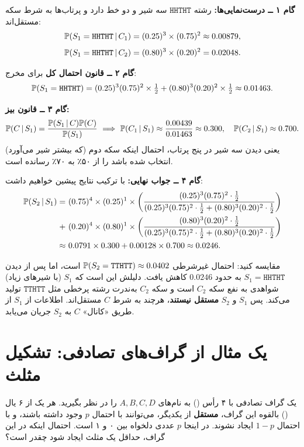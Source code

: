 \textbf{گام ۱ ــ درست‌نمایی‌ها:} رشته $\mathtt{HHTHT}$ سه شیر و دو خط دارد و پرتاب‌ها به شرط سکه مستقل‌اند:
\[
\mathbb{P}(S_1=\mathtt{HHTHT}\,|\, C_1)=(0.25)^3\times(0.75)^2\approx0.00879,
\]
\[
\mathbb{P}(S_1=\mathtt{HHTHT}\,|\, C_2)=(0.80)^3\times(0.20)^2=0.02048 .
\]

\textbf{گام ۲ ــ قانون احتمال کل} برای مخرج:
\[
\mathbb{P}(S_1=\mathtt{HHTHT})=(0.25)^3(0.75)^2\times\tfrac12+(0.80)^3(0.20)^2\times\tfrac12\approx0.01463 .
\]

\textbf{گام ۳ ــ قانون بیز:}
\[
\mathbb{P}(C\,|\, S_1)=\frac{\mathbb{P}(S_1\,|\, C)\mathbb{P}(C)}{\mathbb{P}(S_1)}\ \Longrightarrow\
\mathbb{P}(C_1\,|\, S_1)\approx\frac{0.00439}{0.01463}\approx0.300,\quad
\mathbb{P}(C_2\,|\, S_1)\approx0.700 .
\]
یعنی دیدن سه شیر در پنج پرتاب، احتمال اینکه سکه دوم (که بیشتر شیر می‌آورد) انتخاب شده باشد را از ۵۰٪ به ۷۰٪ رسانده است.

\textbf{گام ۴ ــ جواب نهایی:} با ترکیب نتایج پیشین خواهیم داشت:
\[
\begin{aligned}
\Prob(S_2\given S_1)=\ &(0.75)^4\times(0.25)^1\times\left(\frac{(0.25)^3(0.75)^2\cdot\frac12}{(0.25)^3(0.75)^2\cdot\frac12+(0.80)^3(0.20)^2\cdot\frac12}\right)\\
+\ &(0.20)^4\times(0.80)^1\times\left(\frac{(0.80)^3(0.20)^2\cdot\frac12}{(0.25)^3(0.75)^2\cdot\frac12+(0.80)^3(0.20)^2\cdot\frac12}\right)\\
\approx\ &0.0791\times0.300+0.00128\times0.700\approx0.0246 .
\end{aligned}
\]

\begin{note}
\notetitle مقایسه کنید: احتمال غیرشرطی $\mathbb{P}(S_2=\mathtt{TTHTT})\approx0.0402$ است، اما پس از دیدن $S_1=\mathtt{HHTHT}$ به حدود $0.0246$ کاهش یافت. دلیلش این است که $S_1$ (با شیرهای زیاد) شواهدی به نفع سکه $C_2$ است و سکه $C_2$ به‌ندرت رشته پرخطی مثل $\mathtt{TTHTT}$ تولید می‌کند. پس $S_1$ و $S_2$ \textbf{مستقل نیستند}، هرچند به شرط $C$ مستقل‌اند. اطلاعات از $S_1$ از طریق «کانال» $C$ به $S_2$ جریان می‌یابد.
\end{note}

\section{یک مثال از گراف‌های تصادفی: تشکیل مثلث}

\begin{example}
یک گراف تصادفی با ۴ رأس () به نام‌های $A,B,C,D$ را در نظر بگیرید. هر یک از ۶ یال () بالقوه این گراف، \textbf{مستقل} از یکدیگر، می‌توانند با احتمال $p$ وجود داشته باشند، و با احتمال $1-p$ ایجاد نشوند. در اینجا $p$ عددی دلخواه بین ۰ و ۱ است. احتمال اینکه در این گراف، حداقل یک مثلث ایجاد شود چقدر است؟
\end{example}


